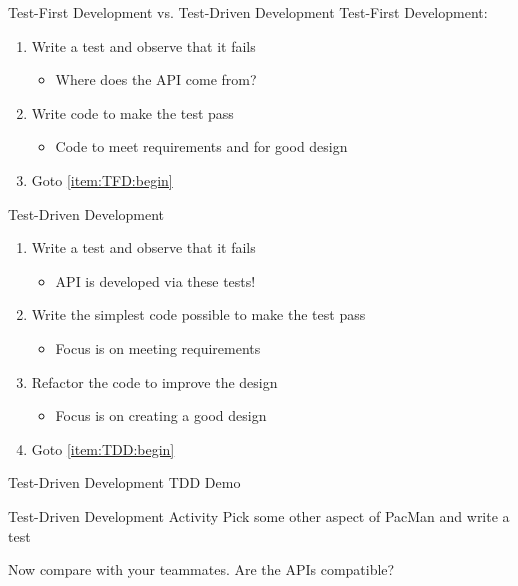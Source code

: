 \documentclass{beamer}
\begin{document}
\begin{frame}{Test-First Development vs. Test-Driven Development}
Test-First Development:
\begin{enumerate}
\item\label{item:TFD:begin} Write a test and observe that it fails
\begin{itemize}
\item Where does the API come from?
\end{itemize}
\item Write code to make the test pass
\begin{itemize}
\item Code to meet requirements and for good design
\end{itemize}
\item Goto \ref{item:TFD:begin}
\end{enumerate}

\bigskip
\pause
Test-Driven Development
\begin{enumerate}
\item\label{item:TDD:begin} Write a test and observe that it fails
\begin{itemize}
\item API is developed via these tests!
\end{itemize}
\item Write the simplest code possible to make the test pass
\begin{itemize}
\item Focus is on meeting requirements
\end{itemize}
\item Refactor the code to improve the design
\begin{itemize}
\item Focus is on creating a good design
\end{itemize}
\item Goto \ref{item:TDD:begin}
\end{enumerate}
\end{frame}

\begin{frame}{Test-Driven Development}
\centering
\Huge TDD Demo
\end{frame}

\begin{frame}{Test-Driven Development Activity}
\centering
Pick some other aspect of PacMan and write a test

\pause
\bigskip
\noindent
Now compare with your teammates. Are the APIs compatible?
\end{frame}
\end{document}
